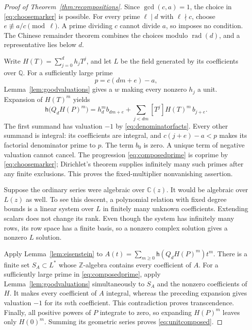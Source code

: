 \documentclass[11pt]{article}
\numberwithin{equation}{section}
\theoremstyle{definition}
\theoremstyle{remark}
\newcommand{\C}{\mathbb C}
\newcommand{\Q}{\mathbb Q}
\newcommand{\Z}{\mathbb Z}
\newcommand{\h}{\mathsf h}
\begin{document}
\begin{proof}[Proof of Theorem~\ref{thm:recompositions}]
Since $\gcd(c,a)=1$, the choice in \eqref{eq:choosemarker} is possible.
For every prime $\ell\mid d$ with $\ell\nmid c$, choose
$e\not\equiv a/c\pmod\ell$. A prime dividing $c$ cannot divide $a$,
so imposes no condition. The Chinese remainder theorem combines the
choices modulo $\operatorname{rad}(d)$, and a representative lies below $d$.

Write $H(T)=\sum_{j=0}^d h_jT^j$, and let $L$ be the field generated by
its coefficients over $\Q$. For a sufficiently large prime
\begin{equation}\label{eq:composedprime}
 p=c(dm+e)-a,
\end{equation}
Lemma~\ref{lem:goodvaluations} gives a $w$ making every nonzero $h_j$
a unit. Expansion of $H(T)^m$ yields
\[
 \h\bigl(Q_dH(P)^m\bigr)
 =h_d^m b_{dm+e}
   +\sum_{j<dm}[T^j]H(T)^m\,b_{j+e}.
\]
The first summand has valuation $-1$ by
\eqref{eq:denominatorfacts}. Every other summand is integral: its
coefficients are integral, and $c(j+e)-a<p$ makes its factorial
denominator prime to $p$. The term $b_0$ is zero. A unique term of
negative valuation cannot cancel. The progression
\eqref{eq:composedprime} is coprime by \eqref{eq:choosemarker}; Dirichlet's
theorem supplies infinitely many such primes after any finite exclusions.
This proves the fixed-multiplier nonvanishing assertion.

Suppose the ordinary series were algebraic over $\C(z)$.
It would be algebraic over $L(z)$ as well. To see this descent, a
polynomial relation with fixed degree bounds is a linear system over
$L$ in finitely many unknown coefficients. Extending scalars does not
change its rank. Even though the system has infinitely many rows, its
row space has a finite basis, so a nonzero complex solution gives a
nonzero $L$ solution.

Apply Lemma~\ref{lem:eisenstein} to
$A(t)=\sum_{m\geq0}\h(Q_dH(P)^m)t^m$. There is a finite set
$S_A\subset L^*$ whose $\Z$-algebra contains every coefficient of $A$.
For a sufficiently large prime in \eqref{eq:composedprime}, apply
Lemma~\ref{lem:goodvaluations} simultaneously to $S_A$ and the nonzero
coefficients of $H$. It makes every coefficient of $A$ integral, whereas
the preceding expansion gives valuation $-1$ for its $m$th coefficient.
This contradiction proves transcendence.
Finally, all positive powers of $P$ integrate to zero, so expanding
$H(P)^m$ leaves only $H(0)^m$. Summing its geometric series proves
\eqref{eq:unitcomposed}.
\end{proof}
\end{document}
